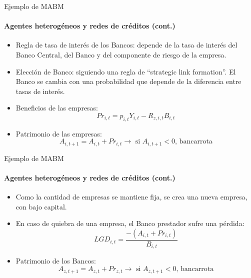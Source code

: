 \documentclass[11pt]{beamer}
\begin{document}
\begin{frame}{Ejemplo de MABM}
\framesubtitle{Agentes heterogéneos y redes de créditos (cont.)}
\begin{itemize}
    \item Regla de tasa de interés de los Bancos: depende de la tasa de interés del Banco Central, del Banco y del componente de riesgo de la empresa.
    \item Elección de Banco: siguiendo una regla de ``strategic link formation''. El Banco se cambia con una probabilidad que depende de la diferencia entre tasas de interés.
    \item Beneficios de las empresas:
    \begin{equation*}
        Pr_{i,t}=p_{i,t}Y_{i,t}-R_{z,i,t}B_{i,t}
    \end{equation*}
    \item Patrimonio de las empresas:
    \begin{equation*}
        A_{i,t+1}=A_{i,t}+Pr_{i,t} \rightarrow \text{ si $A_{i,t+1}<0$, bancarrota}
    \end{equation*}
\end{itemize}
\end{frame}

\begin{frame}{Ejemplo de MABM}
\framesubtitle{Agentes heterogéneos y redes de créditos (cont.)}
\begin{itemize}
    \item Como la cantidad de empresas se mantiene fija, se crea una nueva empresa, con bajo capital.
    \item En caso de quiebra de una empresa, el Banco prestador sufre una pérdida:
    \begin{equation*}
        LGD_{i,t}=\dfrac{-(A_{i,t}+Pr_{i,t})}{B_{i,t}}
    \end{equation*}
    \item Patrimonio de los Bancos:
    \begin{equation*}
        A_{z,t+1}=A_{z,t}+Pr_{z,t} \rightarrow \text{ si $A_{z,t+1}<0$, bancarrota}
    \end{equation*}
\end{itemize}
\end{frame}
\end{document}

